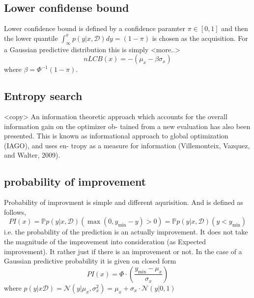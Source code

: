 
\subsection{Lower confidense bound}
Lower confidence bound is defined by a confidence paramter $\pi \in [0,1]$
and then the lower quantile $\int_{\infty}^x p(y|x,\mathcal{D})dy = (1-\pi)$
is chosen as the acquisition. For a Gaussian predictive distribution this is 
simply  <more..>
$$nLCB(x) = - (\mu_x - \beta \sigma_x)$$
where $\beta = \Phi^{-1}(1-\pi)$.  

\subsection{Entropy search}

<copy> An information theoretic approach
which accounts for the overall information gain on the optimizer ob-
tained from a new evaluation has also been presented. This is known
as informational approach to global optimization (IAGO), and uses en-
tropy as a measure for information (Villemonteix, Vazquez, and Walter,
2009).

\subsection{probability of improvement}
Probability of improvment is simple and different aqurisition. And is defined as follows, 
$$PI(x) = \mathbb{P}{p(y|x,\mathcal{D})}(\max(0,y_{\min}-y)>0) = \mathbb{P}{p(y|x,\mathcal{D})}(y<y_{\min})$$ i.e. the
probability of the prediction is an actually improvement. It does not take the magnitude of the
improvement into consideration (as Expected improvement). It rather just if there is an improvement
or not. In the case of a Gaussian predictive probability it is given on closed form
$$PI(x) = \Phi·\left(\frac{y_{\min}-\mu_x}{\sigma_x}\right)$$
where $p(y|x\mathcal{D}) =\mathcal{N}(y|\mu_x,\sigma_x^2) =\mu_x + \sigma_x\cdot\mathcal{N}(y|0,1)$

